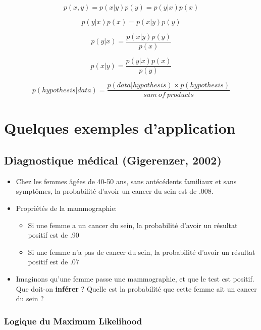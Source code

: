 \documentclass[
  a4paper,11pt,twoside,onecolumn,openright,final,oldfontcommands]{memoir}
\providecommand{\tightlist}{%
  \setlength{\itemsep}{0pt}\setlength{\parskip}{0pt}}
\theoremstyle{definition}
\theoremstyle{definition}
\theoremstyle{definition}
\theoremstyle{remark}
\begin{document}
\[p(x,y) = p(x|y)p(y) = p(y|x)p(x)\]

\[p(y|x)p(x) = p(x|y)p(y)\]

\[p(y|x) = \dfrac{p(x|y)p(y)}{p(x)}\]

\[p(x|y) = \dfrac{p(y|x)p(x)}{p(y)}\]

\[p(hypothesis|data) = \frac{p(data|hypothesis) \times p(hypothesis)}{sum\ of\ products}\]

\hypertarget{quelques-exemples-dapplication}{%
\section{Quelques exemples d'application}\label{quelques-exemples-dapplication}}

\hypertarget{diagnostique-muxe9dical-gigerenzer-2002}{%
\subsection{Diagnostique médical (Gigerenzer, 2002)}\label{diagnostique-muxe9dical-gigerenzer-2002}}

\begin{itemize}
\item
  Chez les femmes âgées de 40-50 ans, sans antécédents familiaux et sans symptômes, la probabilité d'avoir un cancer du sein est de .008.
\item
  Propriétés de la mammographie:

  \begin{itemize}
  \tightlist
  \item
    Si une femme a un cancer du sein, la probabilité d'avoir un résultat positif est de .90
  \item
    Si une femme n'a pas de cancer du sein, la probabilité d'avoir un résultat positif est de .07
  \end{itemize}
\item
  Imaginons qu'une femme passe une mammographie, et que le test est positif. Que doit-on \textbf{inférer} ? Quelle est la probabilité que cette femme ait un cancer du sein ?
\end{itemize}

\hypertarget{logique-du-maximum-likelihood}{%
\subsubsection{Logique du Maximum Likelihood}\label{logique-du-maximum-likelihood}}
\end{document}
